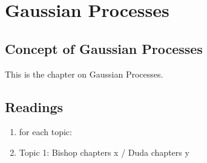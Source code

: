 \documentclass[main]{subfiles}
\begin{document}

\section{Gaussian Processes}
\subsection{Concept of Gaussian Processes}
This is the chapter on Gaussian Processes.
\subsection{Readings}
\begin{enumerate}
\item for each topic:
\item Topic 1: Bishop chapters x / Duda chapters y
\end{enumerate}
\end{document}
